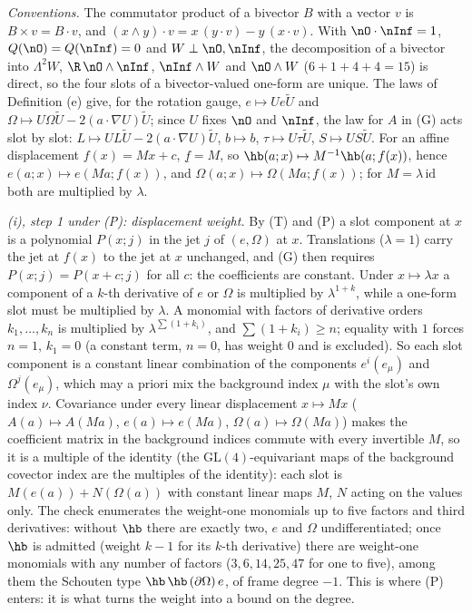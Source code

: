 \emph{Conventions.} The commutator product of a bivector $B$ with a vector $v$ is $B \times v = B \cdot v$, and $(x \wedge y) \cdot v = x\,(y \cdot v) - y\,(x \cdot v)$. With $\nO \cdot \nInf = 1$, $Q(\nO) = Q(\nInf) = 0$ and $W \perp \nO, \nInf$, the decomposition of a bivector into $\Lambda^{2}W$, $\R\,\nO \wedge \nInf$, $\nInf \wedge W$ and $\nO \wedge W$ ($6 + 1 + 4 + 4 = 15$) is direct, so the four slots of a bivector-valued one-form are unique. The laws of Definition (e) give, for the rotation gauge, $e \mapsto U e \tilde U$ and $\Omega \mapsto U\Omega\tilde U - 2(a \cdot \nabla U)\tilde U$; since $U$ fixes $\nO$ and $\nInf$, the law for $A$ in (G) acts slot by slot: $L \mapsto U L \tilde U - 2(a \cdot \nabla U)\tilde U$, $b \mapsto b$, $\tau \mapsto U \tau \tilde U$, $S \mapsto U S \tilde U$. For an affine displacement $f(x) = Mx + c$, $\underline{f} = M$, so $\hb(a; x) \mapsto M^{-1}\hb(a; f(x))$, hence $e(a; x) \mapsto e(Ma; f(x))$, and $\Omega(a; x) \mapsto \Omega(Ma; f(x))$; for $M = \lambda\,\mathrm{id}$ both are multiplied by $\lambda$.

\emph{(i), step 1 under (P): displacement weight.} By (T) and (P) a slot component at $x$ is a polynomial $P(x; j)$ in the jet $j$ of $(e, \Omega)$ at $x$. Translations ($\lambda = 1$) carry the jet at $f(x)$ to the jet at $x$ unchanged, and (G) then requires $P(x; j) = P(x + c; j)$ for all $c$: the coefficients are constant. Under $x \mapsto \lambda x$ a component of a $k$-th derivative of $e$ or $\Omega$ is multiplied by $\lambda^{1 + k}$, while a one-form slot must be multiplied by $\lambda$. A monomial with factors of derivative orders $k_{1}, \ldots, k_{n}$ is multiplied by $\lambda^{\sum(1 + k_{i})}$, and $\sum(1 + k_{i}) \geq n$; equality with $1$ forces $n = 1$, $k_{1} = 0$ (a constant term, $n = 0$, has weight $0$ and is excluded). So each slot component is a constant linear combination of the components $e^{i}(e_{\mu})$ and $\Omega^{j}(e_{\mu})$, which may a priori mix the background index $\mu$ with the slot's own index $\nu$. Covariance under every linear displacement $x \mapsto Mx$ ($A(a) \mapsto A(Ma)$, $e(a) \mapsto e(Ma)$, $\Omega(a) \mapsto \Omega(Ma)$) makes the coefficient matrix in the background indices commute with every invertible $M$, so it is a multiple of the identity (the $\mathrm{GL}(4)$-equivariant maps of the background covector index are the multiples of the identity): each slot is $M(e(a)) + N(\Omega(a))$ with constant linear maps $M$, $N$ acting on the values only. The check enumerates the weight-one monomials up to five factors and third derivatives: without $\hb$ there are exactly two, $e$ and $\Omega$ undifferentiated; once $\hb$ is admitted (weight $k - 1$ for its $k$-th derivative) there are weight-one monomials with any number of factors ($3, 6, 14, 25, 47$ for one to five), among them the Schouten type $\hb\,\hb\,(\partial\Omega)\,e$, of frame degree $-1$. This is where (P) enters: it is what turns the weight into a bound on the degree.

